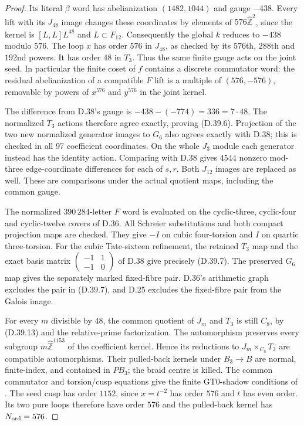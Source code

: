 \begin{proof}
Its literal $\beta$ word has abelianization
$(1482,1044)$ and gauge $-438$. Every lift with its
$J_{48}$ image changes these coordinates by elements
of $576\widehat{\mathbb Z}^2$, since the kernel is
$\overline{[L,L]L^{48}}$ and $L\subset F_{12}$.
Consequently the global $k$ reduces to $-438$ modulo
$576$. The loop $x$ has order $576$ in $J_{48}$,
as checked by its $576$th, $288$th and $192$nd powers.
It has order $48$ in $T_3$. Thus the same finite
gauge acts on the joint seed. In particular the
finite coset of $f$ contains a discrete commutator
word: the residual abelianization of a compatible
$F$ lift is a multiple of $(576,-576)$, removable
by powers of $x^{576}$ and $y^{576}$ in the joint
kernel.

The difference from D.38's gauge is
$-438-(-774)=336=7\cdot48$. The normalized $T_3$
actions therefore agree exactly, proving (D.39.6).
Projection of the two new normalized generator
images to $G_6$ also agrees exactly with D.38;
this is checked in all $97$ coefficient coordinates.
On the whole $J_3$ module each generator instead
has the identity action. Comparing with D.38 gives
$4544$ nonzero mod-three edge-coordinate differences
for each of $s,r$. Both $J_{12}$ images are replaced
as well. These are comparisons under the actual
quotient maps, including the common gauge.

The normalized $390\,284$-letter $F$ word is evaluated
on the cyclic-three, cyclic-four and cyclic-twelve
covers of D.36. All Schreier substitutions and both
compact projection maps are checked. They give
$-I$ on cubic four-torsion and $I$ on quartic
three-torsion. For the cubic Tate-sixteen refinement,
the retained $T_3$ map and the exact basis matrix
$\left(\begin{smallmatrix}-1&1\\-1&0\end{smallmatrix}\right)$
of D.38 give precisely (D.39.7). The preserved $G_6$
map gives the separately marked fixed-fibre pair.
D.36's arithmetic graph excludes the pair in
(D.39.7), and D.25 excludes the fixed-fibre pair
from the Galois image.

For every $m$ divisible by $48$, the common quotient
of $J_m$ and $T_3$ is still $C_8$, by (D.39.13) and
the relative-prime factorization. The automorphism
preserves every subgroup $m\widehat{\mathbb Z}^{1153}$
of the coefficient kernel. Hence its reductions
to $J_m\times_{C_8}T_3$ are compatible automorphisms.
Their pulled-back kernels under $B_3\to B$ are
normal, finite-index, and contained in $PB_3$;
the braid centre is killed. The common commutator
and torsion/cusp equations give the finite GT0-shadow
conditions of \cite[Definitions 2.1 and 2.3]{dBDHP2026}.
The seed cusp has order $1152$, since $x=t^{-2}$
has order $576$ and $t$ has even order. Its two
pure loops therefore have order $576$ and the
pulled-back kernel has $N_{\rm ord}=576$.


\end{proof}
